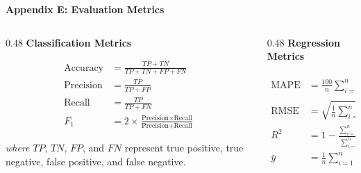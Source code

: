\appendix

\begin{frame}
    \scriptsize
    \vspace{0.25cm}
    {\Large\color{mainblue}\textbf{Appendix E: Evaluation Metrics}}

    \begin{columns}[T,onlytextwidth]

        \begin{column}{0.48\textwidth}
            \textbf{Classification Metrics}

            \vspace{0.2cm}

            \begin{align*}
                \text{Accuracy}  & = \frac{TP + TN}{TP + TN + FP + FN}                    \\[0.15cm]
                \text{Precision} & = \frac{TP}{TP + FP}                                   \\[0.15cm]
                \text{Recall}    & = \frac{TP}{TP + FN}                                   \\[0.15cm]
                F_1              & = 2 \times \frac{\text{Precision} \times \text{Recall}}
                                              {\text{Precision} + \text{Recall}}
            \end{align*}

            \vspace{0.1cm}

            \textit{where} $TP$, $TN$, $FP$, and $FN$ represent true positive, true negative, false positive, and false negative.

        \end{column}

        \begin{column}{0.48\textwidth}
            \textbf{Regression Metrics}

            \vspace{0.2cm}

            \begin{align*}
                \text{MAPE} & = \frac{100}{n}\sum_{i=1}^{n}
                \left|\frac{y_i - \hat{y}_i}{y_i}\right|       \\[0.15cm]
                \text{RMSE} & = \sqrt{\frac{1}{n}\sum_{i=1}^{n}
                                    (y_i - \hat{y}_i)^2} \\[0.15cm]
                R^2         & = 1 -
                \frac{\sum_{i=1}^{n}(y_i - \hat{y}_i)^2}
                {\sum_{i=1}^{n}(y_i - \bar{y})^2}        \\[0.15cm]
                \bar{y}     & = \frac{1}{n}\sum_{i=1}^{n} y_i
            \end{align*}


\end{column}
\end{columns}
\end{frame}
